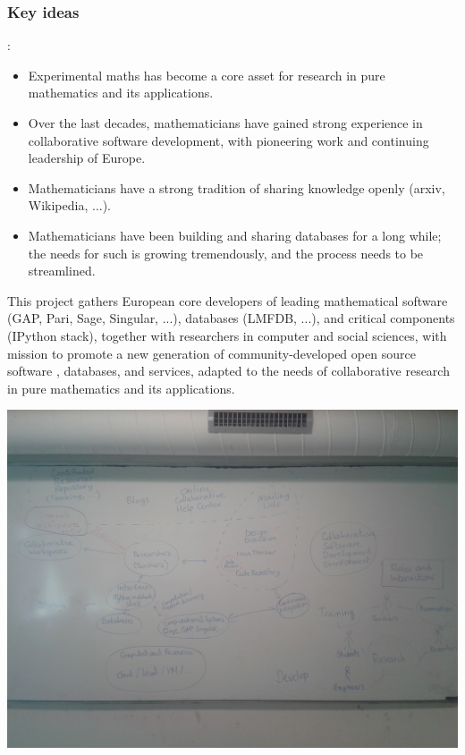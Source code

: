 \documentclass[a4paper,11pt]{article}
\begin{document}


\subsubsection{Key ideas}:
\begin{itemize}
\item Experimental maths has become a core asset for research in pure
  mathematics and its applications.
\item Over the last decades, mathematicians have gained strong
  experience in collaborative software development, with pioneering
  work and continuing leadership of Europe.
\item Mathematicians have a strong tradition of sharing knowledge
  openly (arxiv, Wikipedia, ...).
\item Mathematicians have been building and sharing databases for a
  long while; the needs for such is growing tremendously, and the
  process needs to be streamlined.
\end{itemize}


This project gathers European core developers of leading mathematical
software (GAP, Pari, Sage, Singular, ...), databases (LMFDB, ...), and
critical components (IPython stack), together with researchers in
computer and social sciences, with mission to promote a new generation
of community-developed open source software , databases, and services,
adapted to the needs of collaborative research in pure mathematics and
its applications.


\includegraphics[width=.6\textwidth]{Pictures/TheBigPicture.jpg}
\end{document}
